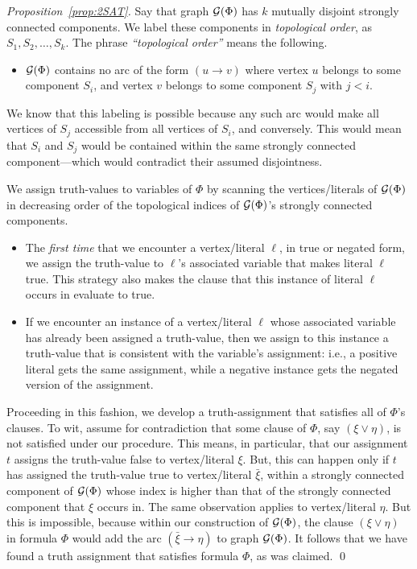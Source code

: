 \begin{proof}[Proposition~\ref{prop:2SAT}]
Say that graph $\mbox{$\cal G$}(\Phi)$ has $k$ mutually disjoint strongly connected components.  We label these components in {\it topological order}, as $S_1, S_2, \ldots, S_k$.  The phrase
{\it ``topological order''} means the following.
\begin{itemize}
\item
$\mbox{$\cal G$}(\Phi)$ contains no arc of the form $(u \rightarrow v)$ where vertex $u$ belongs to some component $S_i$, and vertex $v$ belongs to some component $S_j$ with $j < i$.
\end{itemize}
We know that this labeling is possible because any such arc would make all vertices of $S_j$ accessible from all vertices of $S_i$, and conversely.  This would mean that $S_i$ and $S_j$ would be contained within the same strongly connected component---which would contradict
their assumed disjointness.

\medskip

We assign truth-values to variables of $\Phi$ by scanning the vertices/literals of $\mbox{$\cal G$}(\Phi)$ in decreasing order of the topological indices of $\mbox{$\cal G$}(\Phi)$'s strongly connected components.
\begin{itemize}
\item
The {\em first time} that we encounter a vertex/literal $\ell$, in true or negated form, we assign the truth-value to $\ell$'s associated variable that makes literal $\ell$ {\sc true}.  This strategy also makes the clause that this instance of literal $\ell$ occurs in evaluate to {\sc true}.
\item
If we encounter an instance of a vertex/literal $\ell$ whose associated variable has already been assigned a truth-value, then we assign to this instance a truth-value that is consistent with the
variable's assignment: i.e., a positive literal gets the same assignment, while a negative instance gets the negated version of the assignment.
\end{itemize}

Proceeding in this fashion, we develop a truth-assignment that satisfies all of $\Phi$'s clauses.  To wit, assume for contradiction that some clause of $\Phi$, say $(\xi \vee \eta)$, is not satisfied
under our procedure.  This means, in particular, that our assignment $t$ assigns the truth-value {\sc false} to vertex/literal $\xi$.   But, this can happen only if $t$ has assigned the truth-value {\sc true} to vertex/literal $\bar{\xi}$, within a strongly connected component of $\mbox{$\cal G$}(\Phi)$ whose index is higher than that of the strongly connected component that $\xi$ occurs in.  The same observation applies to vertex/literal $\eta$.   But this is impossible, because within our construction of $\mbox{$\cal G$}(\Phi)$, the clause $(\xi \vee \eta)$ in formula $\Phi$ would add the arc $(\bar{\xi} \rightarrow \eta)$ to graph $\mbox{$\cal G$}(\Phi)$.  It follows that we have found a truth assignment that satisfies formula $\Phi$, as was claimed.  \qed
\end{proof}

